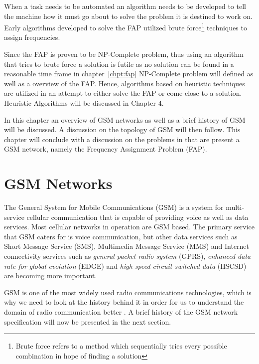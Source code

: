 When a task needs to be automated an algorithm needs to be developed to tell the machine how it must go about to solve the problem it is destined to work on\cite{Karen2004,Eisenblatter,GSMArchitectureProtocolsServices,GSM92,wirelesstelcoMullet}. Early algorithms developed to solve the FAP utilized brute force\footnote{Brute force refers to a method which sequentially tries every possible combination in hope of finding a solution} techniques to assign frequencies\cite{Karen2004,Eisenblatter,GSMArchitectureProtocolsServices,GSM92,wirelesstelcoMullet}.

Since the FAP is proven to be NP-Complete problem, thus using an algorithm that tries to brute force a solution is futile as no solution can be found in a reasonable time frame in chapter~\ref{chpt:fap} NP-Complete problem will defined as well as a overview of the FAP. Hence, algorithms based on heuristic techniques are utilized in an attempt to either solve the FAP or come close to a solution. Heuristic Algorithms will be discussed in Chapter 4.

In this chapter an overview of GSM networks as well as a brief history of GSM will be discussed. A discussion on the topology of GSM will then follow. This chapter will conclude with a discussion on the problems in that are present a GSM network, namely the Frequency Assignment Problem (FAP).

\section{GSM Networks}
The General System for Mobile Communications (GSM) is a system for multi-service cellular communication that is capable of providing voice as well as data services\cite{Karen2004,Eisenblatter,GSMArchitectureProtocolsServices,GSM92,wirelesstelcoMullet}. Most cellular networks in operation are GSM based\cite{Karen2004,Eisenblatter,GSMArchitectureProtocolsServices,GSM92,wirelesstelcoMullet}. The primary service that GSM caters for is voice communication, but other data services such as Short Message Service (SMS), Multimedia Message Service (MMS) and Internet connectivity services such as \emph{general packet radio system} (GPRS), \emph{enhanced data rate for global evolution} (EDGE) and \emph{high speed circuit switched data} (HSCSD) are becoming more important\cite{GSMArchitectureProtocolsServices,Eisenblatter}.

GSM is one of the most widely used radio communications technologies, which is why we need to look at the history behind it in order for us to understand the domain of radio communication better \cite{GSMArchitectureProtocolsServices}. A brief history of the GSM network specification will now be presented in the next section.

